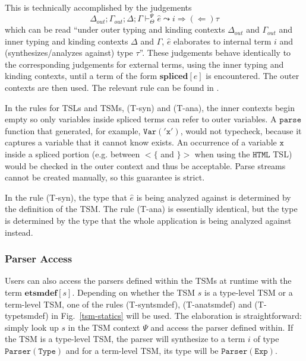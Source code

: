 This is technically accomplished by the judgements 
\[\Delta_{out}; \Gamma_{out}; \Delta; \Gamma \vdash_{\Theta}^{\Psi} \hat{e} \leadsto i {\Rightarrow}{(\Leftarrow)} \tau\]  
which can be read ``under outer typing and kinding contexts $\Delta_{out}$ and $\Gamma_{out}$ and inner typing and kinding contexts $\Delta$ and $\Gamma$,  $\hat{e}$ elaborates to internal term $i$ and (synthesizes/analyzes against) type $\tau$''. These judgements behave identically to the corresponding judgements for external terms, using the inner typing and kinding contexts, until a term of the form $\textbf{spliced}[e]$ is encountered. The outer contexts are then used. The relevant rule can be found in \cite{TSLs}. 

In the rules for TSLs and TSMs, (T-syn) and (T-ana), the inner contexts begin empty so only variables inside spliced terms can refer to outer variables. A $\mathtt{parse}$ function that generated, for example, $\mathtt{Var('x')}$, would not typecheck, because it captures a variable that it cannot know exists. An occurrence of a variable $\mathtt{x}$ inside a spliced portion (e.g. between $\mathtt{<\{}$ and $\mathtt{\}>}$ when using the $\mathtt{HTML}$ TSL) would be checked in the outer context and thus be acceptable. Parse streams cannot be created manually, so this guarantee is strict. %

In the rule (T-syn), the type that $\hat{e}$ is being analyzed against is determined by the definition of the TSM. The rule (T-ana) is essentially identical, but the type is determined by the type that the whole application is being analyzed against instead.

\subsubsection{Parser Access}
Users can also access the parsers defined within the TSMs at runtime with the term $\mathbf{etsmdef}[s]$. Depending on whether the TSM $s$ is a type-level TSM or a term-level TSM, one of the rules (T-syntsmdef), (T-anatsmdef) and (T-typetsmdef) in Fig.~\ref{tsm-statics} will be used. The elaboration is straightforward: simply look up $s$ in the TSM context $\Psi$ and access the parser defined within. If the TSM is a type-level TSM, the parser will synthesize to a term $i$ of type $\mathtt{Parser(Type)}$ and for a term-level TSM, its type will be $\mathtt{Parser(Exp)}$.


